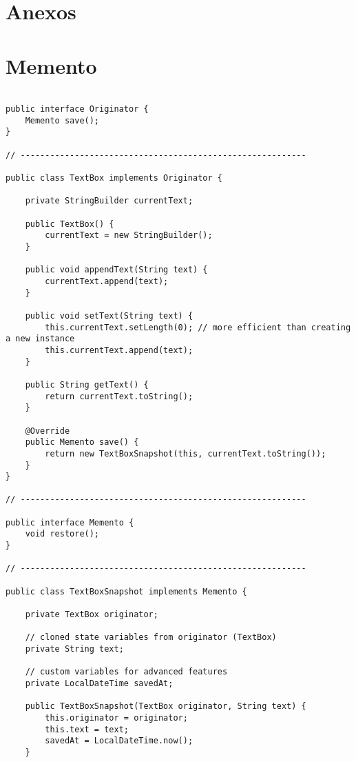 \newpage
\section{Anexos}
\label{sec:anexos}

\appendix

\section{Memento}
\label{anexo:memento}

\begin{verbatim}

public interface Originator {
    Memento save();
}

// ----------------------------------------------------------

public class TextBox implements Originator {

    private StringBuilder currentText;

    public TextBox() {
        currentText = new StringBuilder();
    }

    public void appendText(String text) {
        currentText.append(text);
    }

    public void setText(String text) {
        this.currentText.setLength(0); // more efficient than creating a new instance
        this.currentText.append(text);
    }

    public String getText() {
        return currentText.toString();
    }

    @Override
    public Memento save() {
        return new TextBoxSnapshot(this, currentText.toString());
    }
}

// ----------------------------------------------------------

public interface Memento {
    void restore();
}

// ----------------------------------------------------------

public class TextBoxSnapshot implements Memento {

    private TextBox originator;

    // cloned state variables from originator (TextBox)
    private String text;

    // custom variables for advanced features
    private LocalDateTime savedAt;

    public TextBoxSnapshot(TextBox originator, String text) {
        this.originator = originator;
        this.text = text;
        savedAt = LocalDateTime.now();
    }


\end{verbatim}
